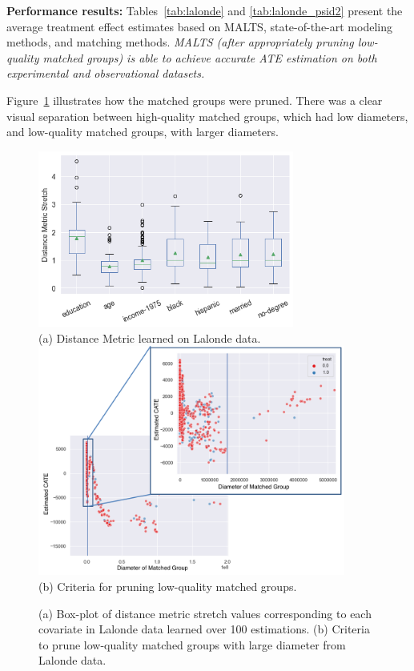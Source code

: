 \textbf{Performance results:} Tables~\ref{tab:lalonde} and \ref{tab:lalonde_psid2} present the average treatment effect estimates based on MALTS, state-of-the-art modeling methods, and matching methods. \textit{MALTS (after appropriately pruning low-quality matched groups) is able to achieve accurate ATE estimation on both experimental and observational datasets.}

Figure~\ref{fig:lalonde_prune} illustrates how the matched groups were pruned. There was a clear visual separation between high-quality matched groups, which had low diameters, and low-quality matched groups, with larger diameters.


\begin{figure}
    \centering
    \includegraphics[width=0.75\textwidth]{Figures/m_lalonde.png}\\
    (a) Distance Metric learned on Lalonde data.\\
    \includegraphics[width=0.9\textwidth]{Figures/lalonde_pruning.png}\\
    (b) Criteria for pruning low-quality matched groups.\\
    \caption{(a) Box-plot of distance metric stretch values corresponding to each covariate in Lalonde data learned over 100 estimations.  (b) Criteria to prune low-quality matched groups with large diameter from Lalonde data.}
    \label{fig:lalonde_prune}
\end{figure}

